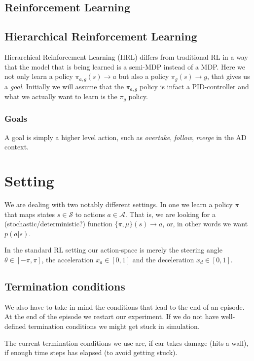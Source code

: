 \documentclass{article}
\begin{document}
\subsection{Reinforcement Learning}

\subsection{Hierarchical Reinforcement Learning}

Hierarchical Reinforcement Learning (HRL) differs from traditional RL in a way that the model that is being learned is a semi-MDP instead of a MDP. Here we not only learn a policy $\pi_{a,g}(s) \rightarrow a$ but also a policy $\pi_g(s) \rightarrow g$, that gives us a \textit{goal}. Initially we will assume that the $\pi_{a,g}$ policy is infact a PID-controller and what we actually want to learn is the $\pi_{g}$ policy.

\subsubsection{Goals}

A goal is simply a higher level action, such as \textit{overtake}, \textit{follow}, \textit{merge} in the AD context. 



\section{Setting}
We are dealing with two notably different settings. In one we learn a policy $\pi$ that maps states $s \in \mathcal{S}$ to actions $a \in \mathcal{A}$. That is, we are looking for a (stochastic/deterministic?) function $\{\pi,\mu\}(s) \rightarrow a$, or, in other words we want $p(a|s)$.

In the standard RL setting our action-space is merely the steering angle $\theta \in [-\pi,\pi]$, the acceleration $x_a \in [0,1]$ and the deceleration $x_d \in [0,1]$.

\subsection{Termination conditions}

We also have to take in mind the conditions that lead to the end of an episode. At the end of the episode we restart our experiment. If we do not have well-defined termination conditions we might get stuck in simulation.

The current termination conditions we use are, if car takes damage (hits a wall), if enough time steps has elapsed (to avoid getting stuck).
\end{document}
